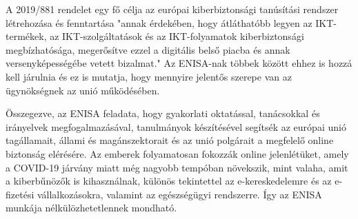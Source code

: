 A 2019/881 rendelet egy fő célja az európai kiberbiztonsági tanúsítási rendszer létrehozása és fenntartása "annak érdekében, hogy átláthatóbb legyen az IKT-termékek, az IKT-szolgáltatások és az IKT-folyamatok kiberbiztonsági megbízhatósága, megerősítve ezzel a digitális belső piacba és annak versenyképességébe vetett bizalmat." \cite{2019/881} Az ENISA-nak többek között ehhez is hozzá kell járulnia és ez is mutatja, hogy mennyire jelentős szerepe van az ügynökségnek az unió működésében.

Összegezve, az ENISA feladata, hogy gyakorlati oktatással, tanácsokkal és irányelvek megfogalmazásával, tanulmányok készítésével segítsék az európai unió tagállamait, állami és magánszektorait és az unió polgárait a megfelelő online biztonság elérésére. Az emberek folyamatosan fokozzák online jelenlétüket, amely a COVID-19 járvány miatt még nagyobb tempóban növekszik, mint valaha, amit a kiberbűnözők is kihasználnak, különös tekintettel az e-kereskedelemre és az e-fizetési vállalkozásokra, valamint az egészségügyi rendszerre. Így az ENISA munkája nélkülözhetetlennek mondható. \cite{ENISA-honlap, ENISA-osszefoglalo}